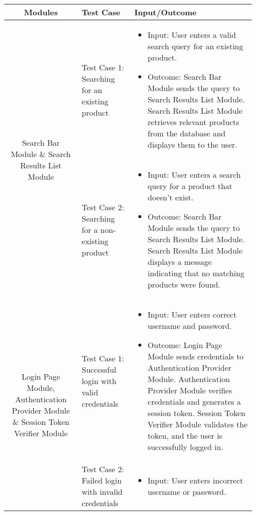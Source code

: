 \documentclass{article}
\begin{document}
\begin{table}[htbp]
    \centering
    \begin{tabularx}{\textwidth}{|c|X|X|}
        \hline
        \textbf{Modules} & \textbf{Test Case} & \textbf{Input/Outcome} \\
        \hline
        \multirow{2}{*}{Search Bar Module \& Search Results List Module} & Test Case 1: Searching for an existing product & 
        \begin{itemize}[leftmargin=*]
            \item Input: User enters a valid search query for an existing product.
            \item Outcome: Search Bar Module sends the query to Search Results List Module. Search Results List Module retrieves relevant products from the database and displays them to the user.
        \end{itemize} \\
        \cline{2-3}
        & Test Case 2: Searching for a non-existing product & 
        \begin{itemize}[leftmargin=*]
            \item Input: User enters a search query for a product that doesn't exist.
            \item Outcome: Search Bar Module sends the query to Search Results List Module. Search Results List Module displays a message indicating that no matching products were found.
        \end{itemize} \\
        \hline
        \multirow{2}{*}{Login Page Module, Authentication Provider Module \& Session Token Verifier Module} & Test Case 1: Successful login with valid credentials & 
        \begin{itemize}[leftmargin=*]
            \item Input: User enters correct username and password.
            \item Outcome: Login Page Module sends credentials to Authentication Provider Module. Authentication Provider Module verifies credentials and generates a session token. Session Token Verifier Module validates the token, and the user is successfully logged in.
        \end{itemize} \\
        \cline{2-3}
        & Test Case 2: Failed login with invalid credentials & 
        \begin{itemize}[leftmargin=*]
            \item Input: User enters incorrect username or password.

\end{itemize}
\end{tabularx}
\end{table}
\end{document}
